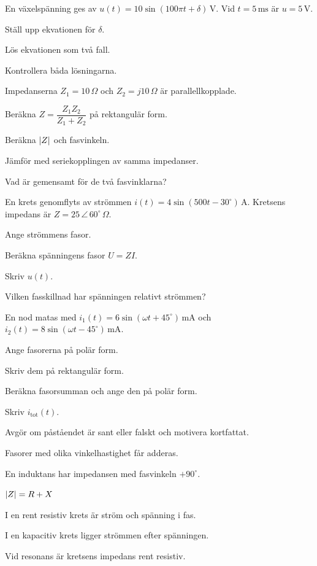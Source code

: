 En växelspänning ges av $u(t) = 10\sin(100\pi t + \delta)\,\text{V}$. Vid $t = 5\,\text{ms}$ är
$u = 5\,\text{V}$.
\begin{parts}
  \item Ställ upp ekvationen för $\delta$.
  \item Lös ekvationen som två fall.
  \item Kontrollera båda lösningarna.
\end{parts}

Impedanserna $Z_1 = 10\,\Omega$ och $Z_2 = j10\,\Omega$ är parallellkopplade.
\begin{parts}
  \item Beräkna $Z = \dfrac{Z_1Z_2}{Z_1 + Z_2}$ på rektangulär form.
  \item Beräkna $\lvert Z\rvert$ och fasvinkeln.
  \item Jämför med seriekopplingen av samma impedanser.
  \item Vad är gemensamt för de två fasvinklarna?
\end{parts}

En krets genomflyts av strömmen $i(t) = 4\sin(500t - 30^{\circ})\,\text{A}$. Kretsens impedans
är $Z = 25\,\angle\,60^{\circ}\,\Omega$.
\begin{parts}
  \item Ange strömmens fasor.
  \item Beräkna spänningens fasor $U = ZI$.
  \item Skriv $u(t)$.
  \item Vilken fasskillnad har spänningen relativt strömmen?
\end{parts}

En nod matas med $i_1(t) = 6\sin(\omega t + 45^{\circ})\,\text{mA}$ och
$i_2(t) = 8\sin(\omega t - 45^{\circ})\,\text{mA}$.
\begin{parts}
  \item Ange fasorerna på polär form.
  \item Skriv dem på rektangulär form.
  \item Beräkna fasorsumman och ange den på polär form.
  \item Skriv $i_{\text{tot}}(t)$.
\end{parts}

Avgör om påståendet är sant eller falskt och motivera kortfattat.
\begin{parts}
  \item Fasorer med olika vinkelhastighet får adderas.
  \item En induktans har impedansen med fasvinkeln $+90^{\circ}$.
  \item $\lvert Z\rvert = R + X$
  \item I en rent resistiv krets är ström och spänning i fas.
  \item I en kapacitiv krets ligger strömmen efter spänningen.
  \item Vid resonans är kretsens impedans rent resistiv.
\end{parts}

